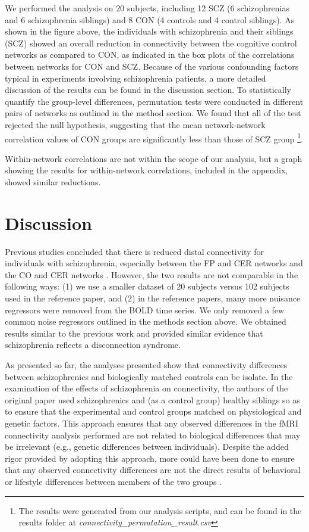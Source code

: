 \documentclass[11pt]{article}
\begin{document}
We performed the analysis on 20 subjects, including 12 SCZ (6 schizophrenias and 6 schizophrenia siblings) and 8 CON (4 controls and 4 control siblings). As shown in the figure above, the individuals with schizophrenia and their siblings (SCZ) showed an overall reduction in connectivity between the cognitive control networks as compared to CON, as indicated in the box plots of the correlations between networks for CON and SCZ. Because of the various confounding factors typical in experiments involving schizophrenia patients, a more detailed discussion of the results can be found in the discussion section.  
To statistically quantify the group-level differences, permutation tests were conducted in different pairs of networks as outlined in the method section. We found that all of the test rejected the null hypothesis, suggesting that the mean network-network correlation values of CON groups are significantly less than those of SCZ group \footnote{The results were generated from our analysis scripts, and can be found in the results folder at \textit{connectivity\_permutation\_result.csv}}.

Within-network correlations are not within the scope of our analysis, but a graph showing the results for within-network correlations, included in the appendix, showed similar reductions.


\section{Discussion}

Previous studies concluded that there is reduced distal connectivity for individuals with schizophrenia, especially between the FP and CER networks and the CO and CER networks \cite{repovs2011, repovs2012}. However, the two results are not comparable in the following ways: (1) we use a smaller dataset of 20 subjects versus 102 subjects used in the reference paper, and (2) in the reference papers, many more nuisance regressors were removed from the BOLD time series. We only removed a few common noise regressors outlined in the methods section above. We obtained results similar to the previous work and provided similar evidence that schizophrenia reflects a disconnection syndrome.

As presented so far, the analyses presented show that connectivity differences
between schizophrenics and biologically matched controls can be isolate. In the
examination of the effects of schizophrenia on connectivity, the authors of the
original paper used schizophrenics and (as a control group) healthy siblings so
as to ensure that the experimental and control groups matched on physiological
and genetic factors. This approach ensures that any observed differences in the
fMRI connectivity analysis performed are not related to biological differences
that may be irrelevant (e.g., genetic differences between individuals). Despite
the added rigor provided by adopting this approach, more could have been done to
ensure that any observed connectivity differences are not the direct results of
behavioral or lifestyle differences between members of the two groups \cite{gur2010functional}. 
\end{document}
